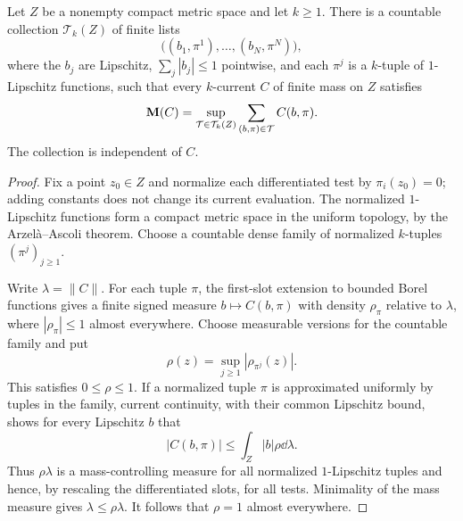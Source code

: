 \begin{lemma}
\label{lem:countable-mass-tests}
Let $Z$ be a nonempty compact metric space and let $k\ge1$.  There is a
countable collection $\mathcal T_k(Z)$ of finite lists
\[
 \bigl((b_1,\pi^1),\ldots,(b_N,\pi^N)\bigr),
\]
where the $b_j$ are Lipschitz, $\sum_j|b_j|\le1$ pointwise, and each
$\pi^j$ is a $k$-tuple of $1$-Lipschitz functions, such that every
$k$-current $C$ of finite mass on $Z$ satisfies
\begin{equation}
 \mathbf M(C)=\sup_{\mathcal T\in\mathcal T_k(Z)}
                  \sum_{(b,\pi)\in\mathcal T}C(b,\pi).
 \label{eq:countable-mass-tests}
\end{equation}
The collection is independent of $C$.
\end{lemma}

\begin{proof}
Fix a point $z_0\in Z$ and normalize each differentiated test by
$\pi_i(z_0)=0$; adding constants does not change its current evaluation.
The normalized $1$-Lipschitz functions form a compact metric space in
the uniform topology, by the Arzel\`a--Ascoli theorem.  Choose a
countable dense family of normalized $k$-tuples
$(\pi^j)_{j\ge1}$.

Write $\lambda=\|C\|$.  For each tuple $\pi$, the first-slot extension
to bounded Borel functions gives a finite signed measure
$b\mapsto C(b,\pi)$ with density $\rho_\pi$ relative to $\lambda$,
where $|\rho_\pi|\le1$ almost everywhere.  Choose measurable versions
for the countable family and put
\[
 \rho(z)=\sup_{j\ge1}|\rho_{\pi^j}(z)|.
\]
This satisfies $0\le\rho\le1$.  If a normalized tuple $\pi$ is
approximated uniformly by tuples in the family, current continuity,
with their common Lipschitz bound, shows for every Lipschitz $b$ that
\[
 |C(b,\pi)|\le\int_Z|b|\rho\dd\lambda.
\]
Thus $\rho\lambda$ is a mass-controlling measure for all normalized
$1$-Lipschitz tuples and hence, by rescaling the differentiated slots,
for all tests.  Minimality of the mass measure gives
$\lambda\le\rho\lambda$.  It follows that $\rho=1$ almost everywhere.


\end{proof}
